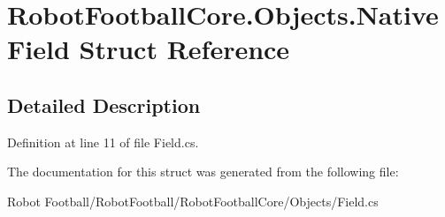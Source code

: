 \hypertarget{struct_robot_football_core_1_1_objects_1_1_native_field}{\section{Robot\-Football\-Core.\-Objects.\-Native\-Field Struct Reference}
\label{struct_robot_football_core_1_1_objects_1_1_native_field}
}


\subsection{Detailed Description}


Definition at line 11 of file Field.\-cs.



The documentation for this struct was generated from the following file\-:\begin{DoxyCompactItemize}
\item 
Robot Football/\-Robot\-Football/\-Robot\-Football\-Core/\-Objects/Field.\-cs\end{DoxyCompactItemize}
